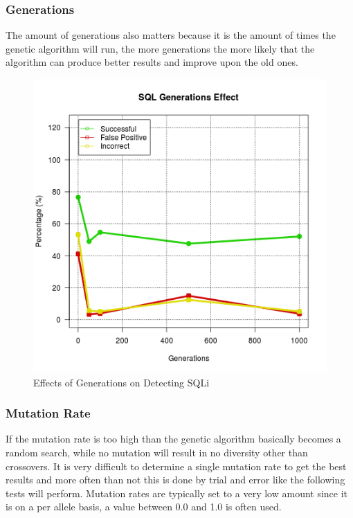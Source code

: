 \subsubsection{Generations}

The amount of generations also matters because it is the amount of times the genetic algorithm will run, the more generations the more likely that the algorithm can produce better results and improve upon the old ones.

\begin{figure}
	\label{fig:resGenerations}
	\includegraphics[width=450px]{./assets/results/ga/generations/Results_SQL.png}
	\caption{Effects of Generations on Detecting SQLi}
\end{figure}

\subsubsection{Mutation Rate}

If the mutation rate is too high than the genetic algorithm basically becomes a random search, while no mutation will result in no diversity other than crossovers.  It is very difficult to determine a single mutation rate to get the best results and more often than not this is done by trial and error like the following tests will perform. %
Mutation rates are typically set to a very low amount since it is on a per allele basis, a value between 0.0 and 1.0 is often used. %

